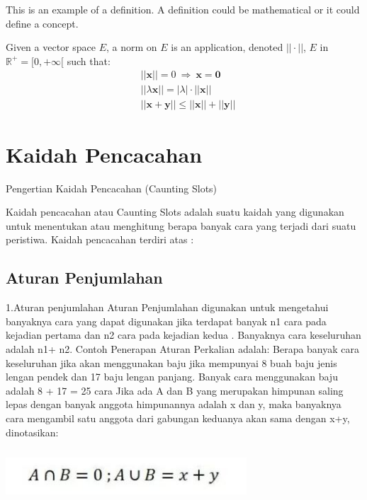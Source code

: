 \documentclass[11pt,fleqn]{book} %
\begin{document}
This is an example of a definition. A definition could be mathematical or it could define a concept.

\begin{definition}
Given a vector space $E$, a norm on $E$ is an application, denoted $||\cdot||$, $E$ in $\mathbb{R}^+=[0,+\infty[$ such that:
\begin{align}
& ||\mathbf{x}||=0\ \Rightarrow\ \mathbf{x}=\mathbf{0}\\
& ||\lambda \mathbf{x}||=|\lambda|\cdot ||\mathbf{x}||\\
& ||\mathbf{x}+\mathbf{y}||\leq ||\mathbf{x}||+||\mathbf{y}||
\end{align}
\end{definition}

\chapter{Kaidah Pencacahan}

Pengertian Kaidah Pencacahan (Caunting Slots)


Kaidah pencacahan atau Caunting Slots adalah suatu kaidah yang digunakan untuk menentukan atau menghitung berapa banyak cara yang terjadi dari suatu peristiwa. Kaidah pencacahan terdiri atas :

\section{Aturan Penjumlahan}
1.Aturan penjumlahan
Aturan Penjumlahan digunakan untuk mengetahui banyaknya cara yang dapat digunakan jika terdapat banyak n1 cara pada kejadian pertama dan n2 cara pada kejadian kedua . Banyaknya
cara keseluruhan adalah n1+ n2.
Contoh Penerapan Aturan Perkalian adalah:
Berapa banyak cara keseluruhan jika akan menggunakan baju jika mempunyai 8 buah baju jenis
lengan pendek dan 17 baju lengan panjang.
Banyak cara menggunakan baju adalah 8 + 17 = 25 cara
 Jika ada A dan B yang merupakan himpunan saling lepas dengan banyak anggota himpunannya adalah x dan y, maka banyaknya cara mengambil satu anggota dari gabungan keduanya akan sama dengan x+y, dinotasikan:
 
 \includegraphics[width = 9cm, height= 2cm]{Pictures/notasijumlah.JPG}
 
\end{document}
